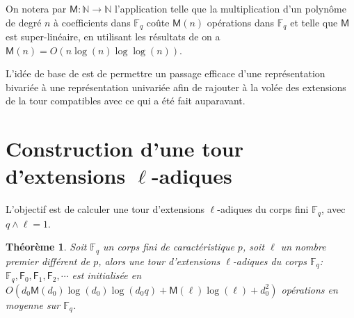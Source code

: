 \documentclass[10pt,a4paper]{book}
\theoremstyle{plain}
\newtheorem{thm}{Théorème}[chapter]
\theoremstyle{definition}
\theoremstyle{definition}
\theoremstyle{definition}
\theoremstyle{definition}
\theoremstyle{remark}
\theoremstyle{remark}
\theoremstyle{definition}
\begin{document}
On notera par $\mathsf{M}: \mathbb{N} \rightarrow \mathbb{N}$ l'application telle que la multiplication d'un polynôme de degré $n$ à coefficients dans $\mathbb{F}_q$ coûte $\mathsf{M}(n)$ opérations dans $\mathbb{F}_q$ et telle que $\mathsf{M}$ est super-linéaire, en utilisant les résultats de \cite{Cantor-Kaltofen91} on a $\mathsf{M}(n)=O(n\log(n) \log \log(n))$. 

L'idée de base de \cite{Doliskani-Schost15} est de permettre un passage efficace d'une représentation bivariée à une représentation univariée afin de rajouter à la volée des extensions de la tour compatibles avec ce qui a été fait auparavant.

\section{Construction d'une tour d'extensions $\ell$-adiques}
L'objectif est de calculer une tour d'extensions $\ell$-adiques du corps fini $\mathbb{F}_q$, avec $q \wedge \ell =1$. 

\begin{thm}
\label{thm:init:tow}
Soit $\mathbb{F}_q$ un corps fini de caractéristique $p$, soit $\ell$ un nombre premier différent de $p$,  alors une tour d'extensions $\ell$-adiques du corps $\mathbb{F}_q$: $\mathbb{F}_q, \mathsf{F}_0, \mathsf{F}_1, \mathsf{F}_2, \cdots$ est initialisée en $O(d_0\mathsf{M}(d_0)\log(d_0)\log(d_0q)+\mathsf{M}(\ell)\log(\ell)+d_0^2)$ opérations en moyenne sur $\mathbb{F}_q$.
\end{thm}
 
\end{document}
